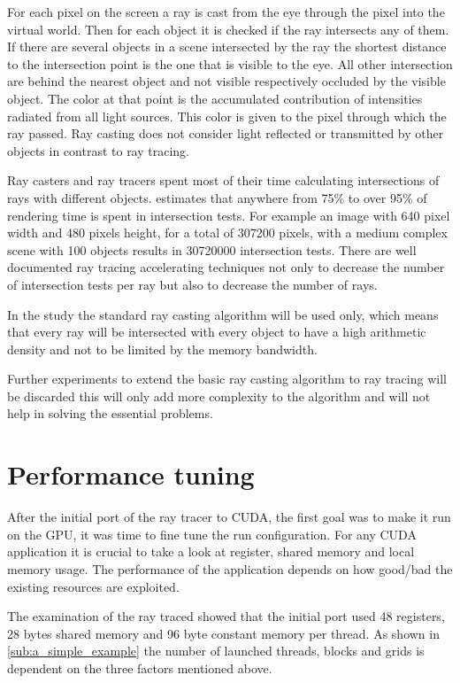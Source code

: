 For each pixel on the screen a ray is cast from the eye through the pixel into
the virtual world. Then for each object it is checked if the ray intersects any
of them. If there are several objects in a scene intersected by the ray the
shortest distance to the intersection point is the one that is visible to the
eye. All other intersection are behind the nearest object and not visible
respectively occluded by the visible object. The color at that point is the
accumulated contribution of intensities radiated from all light sources. This
color is given to the pixel through which the ray passed. Ray casting does not
consider light reflected or transmitted by other objects in contrast to ray
tracing.

Ray casters and ray tracers spent most of their time calculating intersections
of rays with different objects. \citeauthor{citeulike:3770900}
\citep{citeulike:3770900} estimates that anywhere from 75\% to over 95\% of
rendering time is spent in intersection tests. For example an image with 640
pixel width and 480 pixels height, for a total of 307200 pixels, with a medium
complex scene with 100 objects results in 30720000 intersection tests. There are
well documented ray tracing accelerating techniques not only to decrease the
number of intersection tests per ray but also to decrease the number of rays.

In the study the standard ray casting algorithm will be used only, which means
that every ray will be intersected with every object to have a high arithmetic
density and not to be limited by the memory bandwidth.

Further experiments to extend the basic ray casting algorithm to ray tracing 
will be discarded this will only add more complexity to the algorithm and will
not help in solving the essential problems. 

\section{Performance tuning} %
\label{sec:performance_tuning}

After the initial port of the ray tracer to \gls{CUDA}, the first goal was to 
make it run on the \gls{GPU}, it was time to fine tune the run configuration. 
For any \gls{CUDA} application it is crucial to take a look at register, shared 
memory and local memory usage. The performance of the application  depends on
how good/bad the existing resources are exploited.

The examination of the ray traced showed that the initial port used 48
registers, 28 bytes shared memory and 96 byte constant memory per thread. As
shown in \autoref{sub:a_simple_example} the number of launched
threads, blocks and grids is dependent on the three factors mentioned above.

